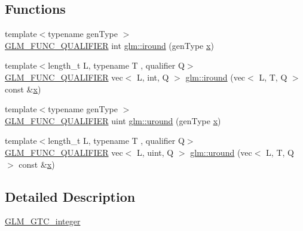 \subsection*{Functions}
\begin{DoxyCompactItemize}
\item 
{\footnotesize template$<$typename gen\+Type $>$ }\\\hyperlink{setup_8hpp_a33fdea6f91c5f834105f7415e2a64407}{G\+L\+M\+\_\+\+F\+U\+N\+C\+\_\+\+Q\+U\+A\+L\+I\+F\+I\+ER} int \hyperlink{namespaceglm_ac64c94481641999914b9eab162db3a0f}{glm\+::iround} (gen\+Type \hyperlink{_s_d_l__opengl_8h_ad0e63d0edcdbd3d79554076bf309fd47}{x})
\item 
{\footnotesize template$<$length\+\_\+t L, typename T , qualifier Q$>$ }\\\hyperlink{setup_8hpp_a33fdea6f91c5f834105f7415e2a64407}{G\+L\+M\+\_\+\+F\+U\+N\+C\+\_\+\+Q\+U\+A\+L\+I\+F\+I\+ER} vec$<$ L, int, Q $>$ \hyperlink{group__gtc__integer_ga57824268ebe13a922f1d69a5d37f637f}{glm\+::iround} (vec$<$ L, T, Q $>$ const \&\hyperlink{_s_d_l__opengl_8h_ad0e63d0edcdbd3d79554076bf309fd47}{x})
\item 
{\footnotesize template$<$typename gen\+Type $>$ }\\\hyperlink{setup_8hpp_a33fdea6f91c5f834105f7415e2a64407}{G\+L\+M\+\_\+\+F\+U\+N\+C\+\_\+\+Q\+U\+A\+L\+I\+F\+I\+ER} uint \hyperlink{namespaceglm_a2929f3403ed935b4537cb5e5b51219ee}{glm\+::uround} (gen\+Type \hyperlink{_s_d_l__opengl_8h_ad0e63d0edcdbd3d79554076bf309fd47}{x})
\item 
{\footnotesize template$<$length\+\_\+t L, typename T , qualifier Q$>$ }\\\hyperlink{setup_8hpp_a33fdea6f91c5f834105f7415e2a64407}{G\+L\+M\+\_\+\+F\+U\+N\+C\+\_\+\+Q\+U\+A\+L\+I\+F\+I\+ER} vec$<$ L, uint, Q $>$ \hyperlink{group__gtc__integer_ga6715b9d573972a0f7763d30d45bcaec4}{glm\+::uround} (vec$<$ L, T, Q $>$ const \&\hyperlink{_s_d_l__opengl_8h_ad0e63d0edcdbd3d79554076bf309fd47}{x})
\end{DoxyCompactItemize}


\subsection{Detailed Description}
\hyperlink{group__gtc__integer}{G\+L\+M\+\_\+\+G\+T\+C\+\_\+integer} 